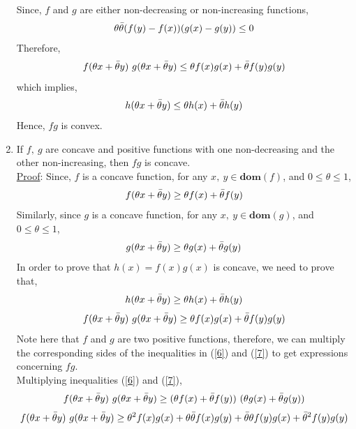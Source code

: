 \documentclass[12pt, draftcls, onecolumn]{IEEEtran}
\begin{document}
\begin{enumerate}
\begin{equation*}
    \end{equation*}
    Since, $f$ and $g$ are either non-decreasing or non-increasing functions,
    \[\theta \Bar{\theta} (f(y)-f(x))(g(x)-g(y)) \leq 0\]
    Therefore,
    \begin{equation}\label{4}
            f(\theta x+\Bar{\theta} y)\ g(\theta x+\Bar{\theta} y) \leq \theta f(x)g(x) + \Bar{\theta} f(y)g(y)
    \end{equation}
    which implies,
    \begin{equation}\label{5}
            h(\theta x+\Bar{\theta} y) \leq \theta h(x) + \Bar{\theta} h(y)
    \end{equation}
    Hence, $fg$ is convex.
    \item If $f,\ g$ are concave and positive functions with one non-decreasing and the other non-increasing, then $fg$ is concave.
    \\\underline{Proof}:
    Since, $f$ is a concave function, for any $x,\ y \in \textbf{dom}(f)$, and $0 \leq \theta \leq 1$,
    \begin{equation}\label{6}
        f(\theta x+\Bar{\theta} y) \geq \theta f(x) + \Bar{\theta} f(y)
    \end{equation}
    Similarly, since $g$ is a concave function, for any $x,\ y \in \textbf{dom}(g)$, and $0 \leq \theta \leq 1$,
    \begin{equation}\label{7}
        g(\theta x+\Bar{\theta} y) \geq \theta g(x) + \Bar{\theta} g(y)
    \end{equation}
    In order to prove that $h(x) = f(x)g(x)$ is concave, we need to prove that,
    \[h(\theta x + \Bar{\theta} y) \geq \theta h(x) + \Bar{\theta} h(y)\]
    \[f(\theta x + \Bar{\theta} y)\ g(\theta x + \Bar{\theta} y) \geq \theta f(x)g(x) + \Bar{\theta} f(y)g(y)\]
    Note here that $f$ and $g$ are two positive functions, therefore, we can multiply the corresponding sides of the inequalities in (\ref{6}) and (\ref{7}) to get expressions concerning $fg$.
    \\Multiplying inequalities (\ref{6}) and (\ref{7}),
    \begin{equation}\label{8}
        f(\theta x+\Bar{\theta} y)\ g(\theta x+\Bar{\theta} y) \geq (\theta f(x) + \Bar{\theta} f(y))\ (\theta g(x) + \Bar{\theta} g(y))
    \end{equation}
    \begin{equation*}
        f(\theta x+\Bar{\theta} y)\ g(\theta x+\Bar{\theta} y) \geq \theta^2 f(x)g(x) + \theta \Bar{\theta} f(x)g(y) + \Bar{\theta} \theta f(y)g(x) + \Bar{\theta}^2 f(y)g(y)

\end{equation*}
\end{enumerate}
\end{document}
